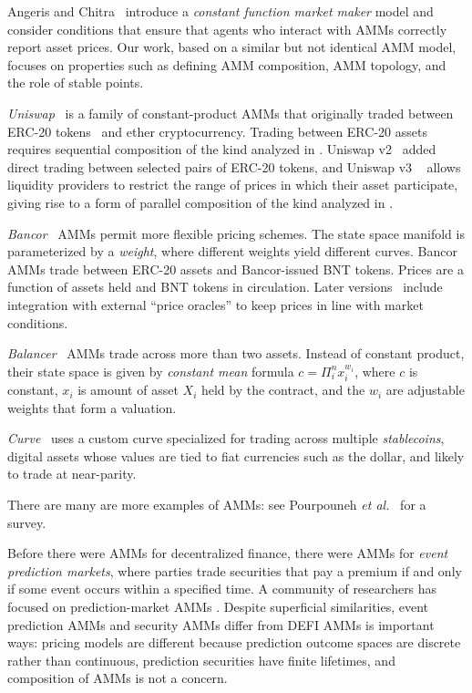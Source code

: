 Angeris and Chitra~\cite{AngerisC2020}
introduce a \emph{constant function market maker} model
and consider conditions that ensure that agents who
interact with AMMs correctly report asset prices.
Our work, based on a similar but not identical AMM model,
focuses on properties such as defining AMM composition,
AMM topology, and the role of stable points.

\emph{Uniswap}~\cite{uniswap,zhang2018}
is a family of constant-product AMMs that originally traded between
ERC-20 tokens~\cite{erc20} and ether cryptocurrency.
Trading between ERC-20 assets requires sequential composition
of the kind analyzed in .
Uniswap v2~\cite{uniswapv2} added direct trading between
selected pairs of ERC-20 tokens,
and Uniswap v3 ~\cite{uniswapv2} allows liquidity providers
to restrict the range of prices in which their asset participate,
giving rise to a form of parallel composition of the kind analyzed in .

\emph{Bancor}~\cite{bancor} AMMs permit more flexible pricing schemes.
The state space manifold is parameterized by a \emph{weight},
where different weights yield different curves.
Bancor AMMs trade between ERC-20 assets and Bancor-issued BNT tokens.
Prices are a function of assets held and BNT tokens in circulation. 
Later versions~\cite{bancorv2} include integration with external
``price oracles'' to keep prices in line with market conditions.

\emph{Balancer}~\cite{balancer} AMMs trade across more than two assets.
Instead of constant product,
their state space is given by \emph{constant mean} formula
$c = \Pi_i^n x_i^{w_i}$,
where $c$ is constant, $x_i$ is amount of asset $X_i$ held by the contract,
and the $w_i$ are adjustable weights that form a valuation.

\emph{Curve}~\cite{curve} uses a custom curve specialized for trading across
multiple \emph{stablecoins},
digital assets whose values are tied to fiat currencies such as the
dollar, and likely to trade at near-parity.

There are many are more examples of AMMs:
see Pourpouneh \emph{et al.}~\cite{pourpouneh} for a survey.

Before there were AMMs for decentralized finance,
there were AMMs for \emph{event prediction markets},
where parties trade securities that pay a premium if
and only if some event occurs within a specified time.
A community of researchers has focused on prediction-market AMMs
\cite{AbernethyYV2011,ChenW2010,ChenP2007,Hanson2003,Hanson2007}.
Despite superficial similarities,
event prediction AMMs and security AMMs differ from DEFI AMMs
is important ways:
pricing models are different because
prediction outcome spaces are discrete rather than continuous,
prediction securities have finite lifetimes,
and composition of AMMs is not a concern.

